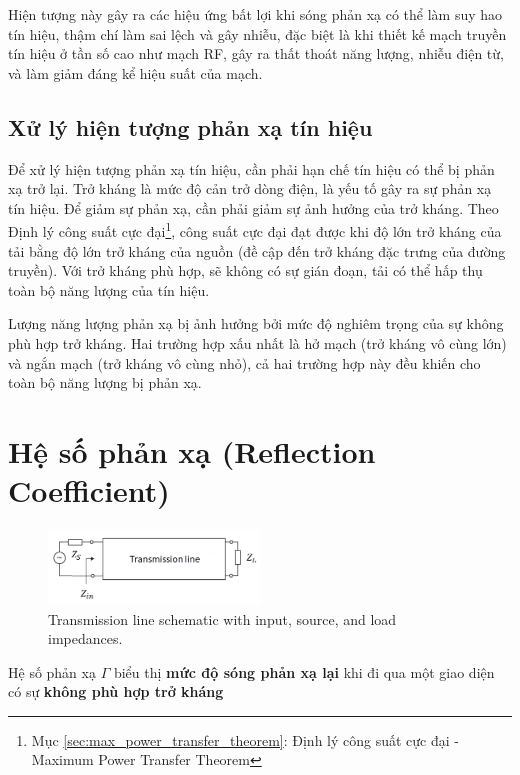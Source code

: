             Hiện tượng này gây ra các hiệu ứng bất lợi khi sóng phản xạ có thể làm suy hao tín hiệu, thậm chí làm sai lệch và gây nhiễu,
            đặc biệt là khi thiết kế mạch truyền tín hiệu ở tần số cao như mạch RF,
            gây ra thất thoát năng lượng, nhiễu điện từ, và làm giảm đáng kể hiệu suất của mạch.

        \subsection{Xử lý hiện tượng phản xạ tín hiệu}
            Để xử lý hiện tượng phản xạ tín hiệu, cần phải hạn chế tín hiệu có thể bị phản xạ trở lại.
            Trở kháng là mức độ cản trở dòng điện, là yếu tố gây ra sự phản xạ tín hiệu.
            Để giảm sự phản xạ, cần phải giảm sự ảnh hưởng của trở kháng.
            Theo Định lý công suất cực đại\footnote{Mục \ref{sec:max_power_transfer_theorem}: Định lý công suất cực đại - Maximum Power Transfer Theorem}, 
            công suất cực đại đạt được khi độ lớn trở kháng của tải bằng độ lớn trở kháng của nguồn (đề cập đến trở kháng đặc trưng của đường truyền).
            Với trở kháng phù hợp, sẽ không có sự gián đoạn, tải có thể hấp thụ toàn bộ năng lượng của tín hiệu.\par

            Lượng năng lượng phản xạ bị ảnh hưởng bởi mức độ nghiêm trọng của sự không phù hợp trở kháng.
            Hai trường hợp xấu nhất là hở mạch (trở kháng vô cùng lớn) và ngắn mạch (trở kháng vô cùng nhỏ), 
            cả hai trường hợp này đều khiến cho toàn bộ năng lượng bị phản xạ.\par

            
    \section{Hệ số phản xạ (Reflection Coefficient)}
        \begin{figure}[h]
            \centering
            \includegraphics[width=0.5\textwidth]{figures/transmission_line.png}
            \caption{Transmission line schematic with input, source, and load impedances.}
        \end{figure}
        Hệ số phản xạ $\Gamma$\cite{cadence2023sparams}\cite{cadence2021transmission} biểu thị \textbf{mức độ sóng phản xạ lại} khi đi qua một giao diện có sự \textbf{không phù hợp trở kháng}\par
        
